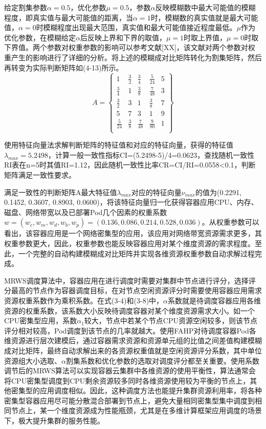 给定割集参数$\alpha=0.5$，优化参数$\mu=0.5$，参数$\alpha$反映模糊数中最大可能值的模糊程度，即真实值与最大可能值的距离，当$\alpha=1$时，模糊数的真实值就是最大可能值，$\alpha=0$时模糊程度出现最大范围，真实值和最大可能值接近程度最低。$\mu$作为优化参数，在模糊给定$\alpha$后反映上界和下界的取值，$\mu=1$时取上界值，$\mu=0$时取下界值。两个参数对权重参数的影响可以参考文献[XX]，该文献对两个参数对权重产生的影响进行了详细的分析。将上述的模糊成对比矩阵转化为割集矩阵，然后再转变为实际判断矩阵如(4-13)所示。
\begin{equation}
A = \left\{\begin{array}{ccccc}
1 & \frac{3}{2} & \frac{3}{4} & \frac{5}{24} & 5 \\
\frac{3}{4} & 1 & \frac{3}{8} & \frac{7}{48} & 3 \\
\frac{3}{2} & 3 & 1 & \frac{3}{8} & 7 \\
5 & 7 & 3 & 1 & 9 \\
\frac{5}{24} & \frac{3}{8} & \frac{7}{48} & \frac{9}{80} & 1 \\
\end{array}\right\}
\end{equation}

使用特征向量法求解判断矩阵的特征值和对应的特征向量，获得的特征值$\lambda_{max}=5.2498$，计算一般一致性指标CI=(5.2498-5)/4=0.0623，查找随机一致性RI表在n=5时其值RI=1.12，因此随机一致性比率CR=CI/RI=0.0558<0.1，判断矩阵满足一致性要求。

满足一致性的判断矩阵A最大特征值$\lambda_{max}$对应的特征向量$\nu_{max}$的值为(0.2291, 0.1452, 0.3607, 0.8903, 0.0600)，将该特征向量归一化获得容器应用CPU、内存、磁盘、网络带宽以及已部署Pod几个因素的权重系数$w=(w_{c}, w_{m}, w_{d}, w_{b}, w_{p})=(0.136, 0.086, 0.214, 0.528, 0.036)$。从权重参数可以看出，该容器应用是一个网络密集型的应用，该应用对网络带宽资源需求更多，其权重参数更大，因此，权重参数也能反映容器应用对某个维度资源的需求程度。至此，一个完整的自动构建模糊成对比矩阵并实现各维资源权重参数自动求解过程完成。

MRWS调度算法中，容器应用在进行调度时需要对集群中节点进行评分，选择评分最高的节点作为容器调度目标，在对节点空闲资源评分时需要使用容器应用需求资源权重系数作为乘积系数。在式(3-4)和(3-8)中，$\alpha$系数就是待调度容器应用各维资源的权重系数，该系数大小反映待调度容器对某个维度资源需求大小。如一个CPU密集型应用，系数$\alpha_{1}$较大，节点中若某个节点CPU资源空闲较多，则该节点评分相对较高，Pod调度到该节点的几率就越大。使用FAHP对待调度容器Pod各维资源进行层次建模后，通过容器需求资源和资源单元组的比值之间差值构建模糊成对比矩阵，最终自动求解出来的各资源权重值就是空闲资源评分系数，其中单位资源组大小选取、$\alpha$割集系数和优化参数的选取对调度评分都至关重要。使用系数调节后的MRWS算法可以实现容器云集群中各维资源的使用平衡性，算法通常会将CPU密集型调度到CPU剩余资源较多同时各维资源使用较为平衡的节点上，其他密集型的应用调度相似。因此，这种调度方法也能提升集群资源利用率，将各种密集型容器应用尽可能分散混合部署到节点上，避免大量相同密集型集中调度到相同节点上，某一个维度资源成为性能瓶颈，尤其是在多维计算框架应用调度的场景下，极大提升集群的服务性能。

